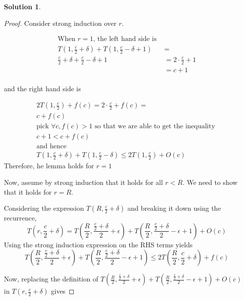 \documentclass[11pt]{article}
\theoremstyle{definition}
\newtheorem*{solution}{Solution}
\begin{document}
\begin{solution}
\begin{proof}
        Consider strong induction over $r$.


        \begin{align*}
            \text{When $r = 1$, the left hand side is } \\
            T \left(1, \frac{c}{2} + \delta\right) + T \left(1, \frac{c}{2} - \delta + 1 \right) &=  \\
            \frac{c}{2} + \delta + \frac{c}{2} - \delta + 1 & = 2 \cdot \frac{c}{2} + 1 \\
            &= c + 1 \tag{(since T(1, c) = c)} \\
        \end{align*}
         
        and the right hand side is
        
        \begin{gather*}
            2T \left(1, \frac{c}{2} \right) + f(c) = 2 \cdot \frac c 2 + f(c) = \\
            c + f(c) \\
            \text{pick $\forall c, f(c) > 1$ so that we are able to get the inequality } \\
            c + 1 < c + f(c) \\
            \text{and hence} \\
            T \left(1, \frac{c}{2} + \delta\right) + T \left(1, \frac{c}{2} - \delta \right) \leq 2T \left(1, \frac{c}{2} \right) + O(c)
        \end{gather*}
        Therefore, he lemma holds for $r = 1$


        Now, assume by strong induction that it holds for all $r < R$. We need to show that it holds for $r = R$.

        Considering the expression $T \left(R, \frac{c}{2} + \delta \right)$ and breaking it down using the recurrence, 
        $$
        T \left(r, \frac{c}{2} + \delta \right) = T\left(\frac{R}{2}, \frac{\frac{c}{2} + \delta}{2} + \epsilon \right) + T\left(\frac{R}{2}, \frac{\frac{c}{2} + \delta}{2} - \epsilon + 1 \right) + O(c)
        $$
        Using the strong induction expression on the RHS terms yields
        \[
        T\left(\frac{R}{2}, \frac{\frac{c}{2} + \delta}{2} + \epsilon \right) + 
        T\left(\frac{R}{2}, \frac{\frac{c}{2} + \delta}{2} - \epsilon + 1 \right) \leq 2T\left(\frac{R}{2}, \frac{c}{2} + \delta \right) + f(c) \tag*{$f(c) \in O(c)$}
        \]

        Now, replacing the definition of
        {\small
        $ T\left(\frac{R}{2}, \frac{\frac{c}{2} + \delta}{2} + \epsilon \right) + T\left(\frac{R}{2}, \frac{\frac{c}{2} + \delta}{2} - \epsilon + 1 \right) + O(c) $
        }
        in
        {\small $T \left(r, \frac{c}{2} + \delta \right)$ }
        gives


\end{proof}
\end{solution}
\end{document}
